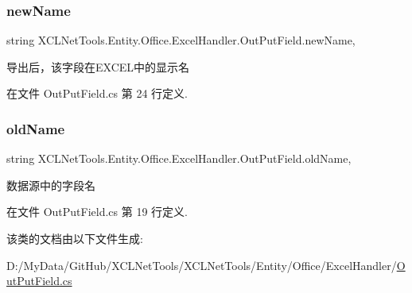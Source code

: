 \subsubsection{\texorpdfstring{new\+Name}{newName}}
{\footnotesize\ttfamily string X\+C\+L\+Net\+Tools.\+Entity.\+Office.\+Excel\+Handler.\+Out\+Put\+Field.\+new\+Name\hspace{0.3cm}{\ttfamily [get]}, {\ttfamily [set]}}



导出后，该字段在\+E\+X\+C\+E\+L中的显示名 



在文件 Out\+Put\+Field.\+cs 第 24 行定义.

\mbox{\label{class_x_c_l_net_tools_1_1_entity_1_1_office_1_1_excel_handler_1_1_out_put_field_a6f62cc17246410ac6f6a352cd04bc1a2}} 
\subsubsection{\texorpdfstring{old\+Name}{oldName}}
{\footnotesize\ttfamily string X\+C\+L\+Net\+Tools.\+Entity.\+Office.\+Excel\+Handler.\+Out\+Put\+Field.\+old\+Name\hspace{0.3cm}{\ttfamily [get]}, {\ttfamily [set]}}



数据源中的字段名 



在文件 Out\+Put\+Field.\+cs 第 19 行定义.



该类的文档由以下文件生成\+:\begin{DoxyCompactItemize}
\item 
D\+:/\+My\+Data/\+Git\+Hub/\+X\+C\+L\+Net\+Tools/\+X\+C\+L\+Net\+Tools/\+Entity/\+Office/\+Excel\+Handler/\hyperlink{_out_put_field_8cs}{Out\+Put\+Field.\+cs}\end{DoxyCompactItemize}
